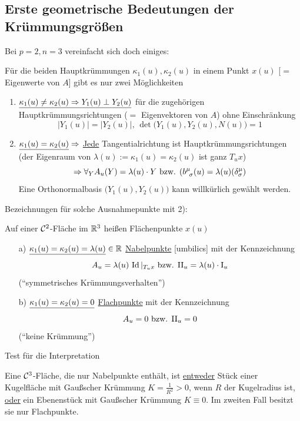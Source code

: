\subsection{Erste geometrische Bedeutungen der Krümmungsgrößen}
Bei \(p = 2, n = 3\) vereinfacht sich doch einiges: \par
Für die beiden Hauptkrümmungen \(\kappa_1(u), \kappa_2(u)\) in einem Punkt \(x(u)\) [\(=\) Eigenwerte von \(A\)] gibt es nur zwei Möglichkeiten
\begin{enumerate}
 \item \(\uline{\kappa_1(u) \ne \kappa_2(u) \Rightarrow Y_1(u) \perp Y_2(u)}\) für die zugehörigen Hauptkrümmungsrichtungen (\(=\) Eigenvektoren von \(A\)) ohne Einschränkung
 \[
  |Y_1(u)| = |Y_2(u)|, \, \det \big(Y_1(u), Y_2(u), N(u)\big) = 1
 \]
 \item \(\uline{\kappa_1(u) = \kappa_2(u)} \Rightarrow\) \uline{Jede} Tangentialrichtung ist Hauptkrümmungsrichtungen (der Eigenraum  von \(\lambda(u) := \kappa_1(u) = \kappa_2(u)\) ist ganz \(T_u x\))
 \[
  \Rightarrow \forall_Y A_u(Y) = \lambda(u) \cdot Y \text{ bzw. } (b^{\mu}_{\;\,\sigma} (u) = \lambda(u) (\delta^\mu_\sigma)
 \]
 Eine Orthonormalbasis \(\big(Y_1(u), Y_2(u)\big)\) kann willkürlich gewählt werden. \par
 \par
\end{enumerate}
 Bezeichnungen für solche Ausnahmepunkte mit 2):
 \begin{definition}
  Auf einer \(\mathcal{C}^2\)-Fläche im \(\mathbb{R}^3\) heißen Flächenpunkte \(x(u)\) 
  \begin{enumerate}
   \item[a)] \(\uline{\kappa_1(u) = \kappa_2(u) = \lambda (u)} \in \IR\) \uline{Nabelpunkte} [umbilics] mit der Kennzeichnung
   \[
    A_u = \lambda(u) \, \Id|_{T_u x} \text{ bzw. } \Rom 2_u = \lambda(u) \cdot \Rom 1_u
   \]
   (``symmetrisches Krümmungsverhalten'')
   \item[b)] \(\uline{\kappa_1(u) = \kappa_2(u) = 0}\) \uline{Flachpunkte} mit der Kennzeichnung
   \[
    A_u = 0 \text{ bzw. } \Rom 2_u = 0
   \]
   (``keine Krümmung'')
  \end{enumerate}
 \end{definition}

Test für die Interpretation

\begin{satz}\label{satz231}
 Eine \(\mathcal{C}^3\)-Fläche, die nur Nabelpunkte enthält, ist \uline{entweder} Stück einer Kugelfläche mit Gaußscher Krümmung \(K = \frac1{R^2} >0\), wenn \(R\) der Kugelradius ist, \uline{oder} ein Ebenenstück mit Gaußscher Krümmung \(K \equiv 0\). Im zweiten Fall besitzt sie nur Flachpunkte.
\end{satz}

